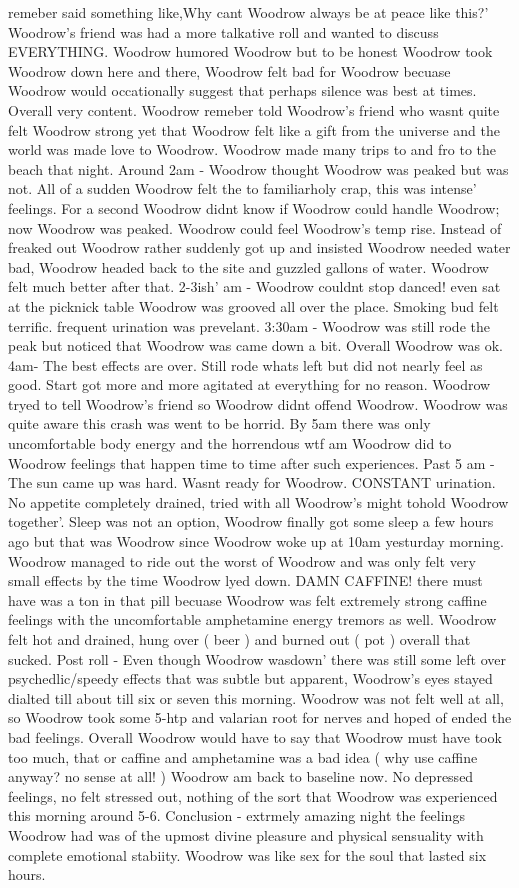 \documentclass[12pt]{book}
\begin{document}
remeber said something like,Why cant Woodrow always be at peace like this?' Woodrow's friend was had a more talkative roll and wanted to discuss EVERYTHING. Woodrow humored Woodrow but to be honest Woodrow took Woodrow down here and there, Woodrow felt bad for Woodrow becuase Woodrow would occationally suggest that perhaps silence was best at times. Overall very content. Woodrow remeber told Woodrow's friend who wasnt quite felt Woodrow strong yet that Woodrow felt like a gift from the universe and the world was made love to Woodrow. Woodrow made many trips to and fro to the beach that night. Around 2am - Woodrow thought Woodrow was peaked but was not. All of a sudden Woodrow felt the to familiarholy crap, this was intense' feelings. For a second Woodrow didnt know if Woodrow could handle Woodrow; now Woodrow was peaked. Woodrow could feel Woodrow's temp rise. Instead of freaked out Woodrow rather suddenly got up and insisted Woodrow needed water bad, Woodrow headed back to the site and guzzled gallons of water. Woodrow felt much better after that. 2-3ish' am - Woodrow couldnt stop danced! even sat at the picknick table Woodrow was grooved all over the place. Smoking bud felt terrific. frequent urination was prevelant. 3:30am - Woodrow was still rode the peak but noticed that Woodrow was came down a bit. Overall Woodrow was ok. 4am- The best effects are over. Still rode whats left but did not nearly feel as good. Start got more and more agitated at everything for no reason. Woodrow tryed to tell Woodrow's friend so Woodrow didnt offend Woodrow. Woodrow was quite aware this crash was went to be horrid. By 5am there was only uncomfortable body energy and the horrendous wtf am Woodrow did to Woodrow feelings that happen time to time after such experiences. Past 5 am - The sun came up was hard. Wasnt ready for Woodrow. CONSTANT urination. No appetite completely drained, tried with all Woodrow's might tohold Woodrow together'. Sleep was not an option, Woodrow finally got some sleep a few hours ago but that was Woodrow since Woodrow woke up at 10am yesturday morning. Woodrow managed to ride out the worst of Woodrow and was only felt very small effects by the time Woodrow lyed down. DAMN CAFFINE! there must have was a ton in that pill becuase Woodrow was felt extremely strong caffine feelings with the uncomfortable amphetamine energy tremors as well. Woodrow felt hot and drained, hung over ( beer ) and burned out ( pot ) overall that sucked. Post roll - Even though Woodrow wasdown' there was still some left over psychedlic/speedy effects that was subtle but apparent, Woodrow's eyes stayed dialted till about till six or seven this morning. Woodrow was not felt well at all, so Woodrow took some 5-htp and valarian root for nerves and hoped of ended the bad feelings. Overall Woodrow would have to say that Woodrow must have took too much, that or caffine and amphetamine was a bad idea ( why use caffine anyway? no sense at all! ) Woodrow am back to baseline now. No depressed feelings, no felt stressed out, nothing of the sort that Woodrow was experienced this morning around 5-6. Conclusion - extrmely amazing night the feelings Woodrow had was of the upmost divine pleasure and physical sensuality with complete emotional stabiity. Woodrow was like sex for the soul that lasted six hours. 
\end{document}
